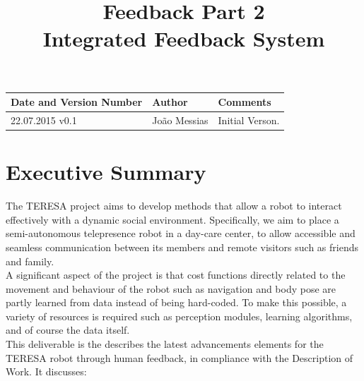 \documentclass[a4paper,11pt]{report}
\title{Feedback Part 2\\ Integrated Feedback System}
\begin{document}
\maketitle
\makeheader


\begin{documentinfo}

\begin{tabular}{|p{5cm}|p{4cm}|p{5cm}|}
        \hline
        \rowcolor{gray!50}
        Date and Version Number & Author & Comments\\ \hline
        22.07.2015 v0.1 & Jo\~ao Messias & Initial Verson.\\
\end{tabular}

\end{documentinfo}


\pagebreak
\pagebreak

\tableofcontents

\pagebreak

\listoffigures

\pagebreak

\listoftables

\pagebreak




\section{Executive Summary}\label{sec:sum}

The TERESA project aims to develop methods that allow a robot to interact effectively with a dynamic social environment. Specifically, we aim to place a semi-autonomous telepresence robot in a day-care center, to allow accessible and seamless communication between its members and remote visitors such as friends and family.\\

 A significant aspect of the project is that cost functions directly related to the movement and behaviour of the robot such as navigation and body pose are partly learned from data instead of being hard-coded. To make this possible, a variety of resources is required such as perception modules, learning algorithms, and of course the data itself. \\

This deliverable is the describes the latest advancements 
elements for the TERESA robot through human feedback, in compliance with the 
Description of Work. It discusses:
\end{document}

